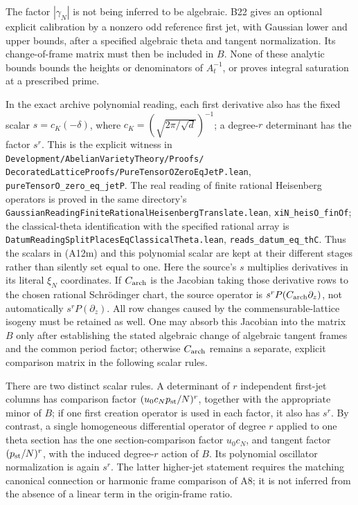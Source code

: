 The factor $|\gamma_N|$ is not being inferred to be
algebraic.  B22 gives an optional explicit calibration
by a nonzero odd reference first jet, with Gaussian
lower and upper bounds, after a specified algebraic
theta and tangent normalization.  Its change-of-frame
matrix must then be included in $B$.  None of these
analytic bounds bounds the heights or denominators
of $A_t^{-1}$, or proves integral saturation at a
prescribed prime.

In the exact archive polynomial reading, each first
derivative also has the fixed scalar
$s=c_K(-\delta)$, where
$c_K=(\sqrt{2\pi/\sqrt d})^{-1}$; a degree-$r$
determinant has the factor $s^r$.  This is the
explicit witness in
\texttt{Development/AbelianVarietyTheory/Proofs/}
\texttt{DecoratedLatticeProofs/PureTensorOZeroEqJetP.lean},
\texttt{pureTensorO\_zero\_eq\_jetP}.
The real reading of finite rational Heisenberg operators
is proved in the same directory's
\texttt{GaussianReadingFiniteRationalHeisenbergTranslate.lean},
\texttt{xiN\_heisO\_finOf}; the classical-theta identification
with the specified rational array is
\texttt{DatumReadingSplitPlacesEqClassicalTheta.lean},
\texttt{reads\_datum\_eq\_thC}.
Thus the scalars in (A12m) and this polynomial scalar
are kept at their different stages rather than
silently set equal to one.
Here the source's $s$ multiplies derivatives in its
literal $\xi_N$ coordinates.  If $C_{\rm arch}$ is the
Jacobian taking those derivative rows to the chosen
rational Schr\"odinger chart, the source operator is
$s^rP(C_{\rm arch}\partial_z)$, not automatically
$s^rP(\partial_z)$.  All row changes caused by the
commensurable-lattice isogeny must be retained as well.
One may absorb this Jacobian into the matrix $B$ only
after establishing the stated algebraic change of
algebraic tangent frames and the common period factor;
otherwise $C_{\rm arch}$ remains a separate, explicit
comparison matrix in the following scalar rules.

There are two distinct scalar rules.  A determinant of
$r$ independent first-jet columns has comparison factor
$(u_0c_Np_{\rm st}/N)^r$, together with the appropriate
minor of $B$; if one first creation operator is used in
each factor, it also has $s^r$.  By contrast, a single
homogeneous differential operator of degree $r$ applied
to one theta section has the one section-comparison
factor $u_0c_N$, and tangent factor
$(p_{\rm st}/N)^r$, with the induced degree-$r$ action
of $B$.  Its polynomial oscillator normalization is
again $s^r$.  The latter higher-jet statement requires
the matching canonical connection or harmonic frame
comparison of A8; it is not inferred from the absence
of a linear term in the origin-frame ratio.

